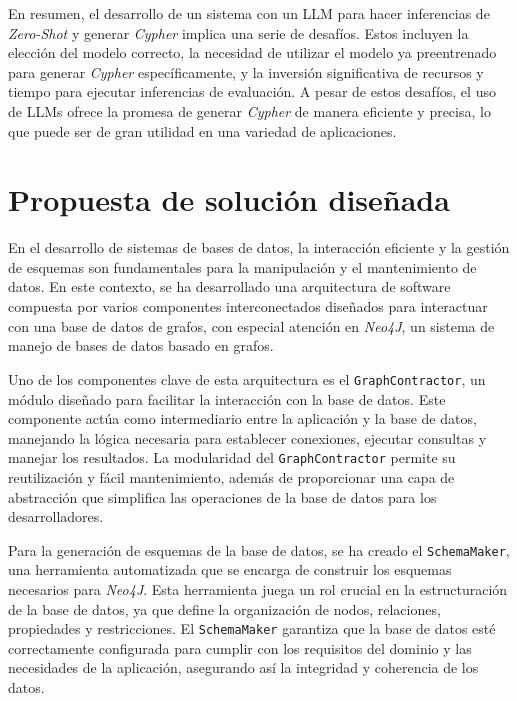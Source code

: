 En resumen, el desarrollo de un sistema con un LLM para hacer inferencias de \textit{Zero-Shot} y generar \textit{Cypher} implica una serie de desafíos. Estos incluyen la elección del modelo correcto, la necesidad de utilizar el modelo ya preentrenado para generar \textit{Cypher} específicamente, y la inversión significativa de recursos y tiempo para ejecutar inferencias de evaluación. A pesar de estos desafíos, el uso de LLMs ofrece la promesa de generar \textit{Cypher} de manera eficiente y precisa, lo que puede ser de gran utilidad en una variedad de aplicaciones.

\section{Propuesta de solución diseñada} \label{designed_proposal}

En el desarrollo de sistemas de bases de datos, la interacción eficiente y la gestión de esquemas son fundamentales para la manipulación y el mantenimiento de datos. En este contexto, se ha desarrollado una arquitectura de software compuesta por varios componentes interconectados diseñados para interactuar con una base de datos de grafos, con especial atención en \textit{Neo4J}, un sistema de manejo de bases de datos basado en grafos.

Uno de los componentes clave de esta arquitectura es el \texttt{GraphContractor}, un módulo diseñado para facilitar la interacción con la base de datos. Este componente actúa como intermediario entre la aplicación y la base de datos, manejando la lógica necesaria para establecer conexiones, ejecutar consultas y manejar los resultados. La modularidad del \texttt{GraphContractor} permite su reutilización y fácil mantenimiento, además de proporcionar una capa de abstracción que simplifica las operaciones de la base de datos para los desarrolladores.

Para la generación de esquemas de la base de datos, se ha creado el \texttt{SchemaMaker}, una herramienta automatizada que se encarga de construir los esquemas necesarios para \textit{Neo4J}. Esta herramienta juega un rol crucial en la estructuración de la base de datos, ya que define la organización de nodos, relaciones, propiedades y restricciones. El \texttt{SchemaMaker} garantiza que la base de datos esté correctamente configurada para cumplir con los requisitos del dominio y las necesidades de la aplicación, asegurando así la integridad y coherencia de los datos.


